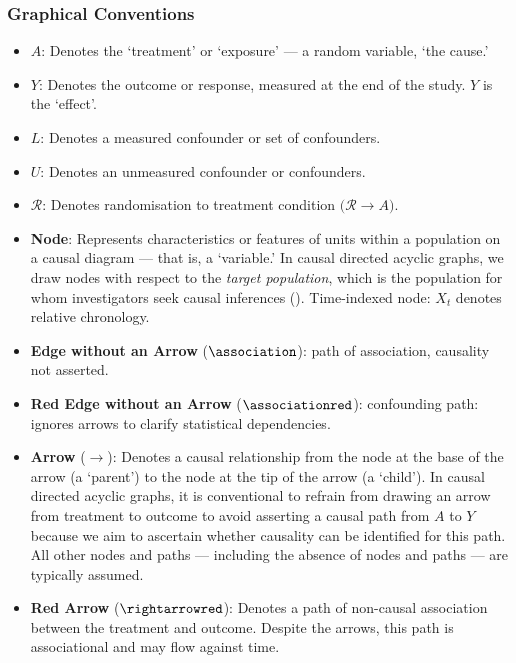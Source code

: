 \documentclass[
  single column]{article}
\begin{document}
\subsubsection{Graphical Conventions}\label{graphical-conventions}

\begin{itemize}
\item
  \textbf{\(A\)}: Denotes the `treatment' or `exposure' --- a random
  variable, `the cause.'
\item
  \textbf{\(Y\)}: Denotes the outcome or response, measured at the end
  of the study. \(Y\) is the `effect'.
\item
  \textbf{\(L\)}: Denotes a measured confounder or set of confounders.
\item
  \textbf{\(U\)}: Denotes an unmeasured confounder or confounders.
\item
  \(\mathbf{\mathcal{R}}\): Denotes randomisation to treatment condition
  \(\big(\mathcal{R} \rightarrow A\big)\).
\item
  \textbf{Node}: Represents characteristics or features of units within
  a population on a causal diagram --- that is, a `variable.' In causal
  directed acyclic graphs, we draw nodes with respect to the
  \emph{target population}, which is the population for whom
  investigators seek causal inferences (). Time-indexed node: \(X_t\) denotes relative
  chronology.
\item
  \textbf{Edge without an Arrow} (\(\association\)): path of
  association, causality not asserted.
\item
  \textbf{Red Edge without an Arrow} (\(\associationred\)): confounding
  path: ignores arrows to clarify statistical dependencies.
\item
  \textbf{Arrow} (\(\rightarrow\)): Denotes a causal relationship from
  the node at the base of the arrow (a `parent') to the node at the tip
  of the arrow (a `child'). In causal directed acyclic graphs, it is
  conventional to refrain from drawing an arrow from treatment to
  outcome to avoid asserting a causal path from \(A\) to \(Y\) because
  we aim to ascertain whether causality can be identified for this path.
  All other nodes and paths --- including the absence of nodes and paths
  --- are typically assumed.
\item
  \textbf{Red Arrow} (\(\rightarrowred\)): Denotes a path of non-causal
  association between the treatment and outcome. Despite the arrows,
  this path is associational and may flow against time.

\end{itemize}
\end{document}
